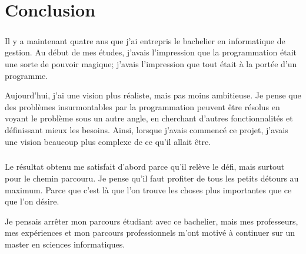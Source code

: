 \chapter{Conclusion}
\label{ch:conclusion}

\paragraph{}
Il y a maintenant quatre ans que j'ai entrepris le bachelier en informatique de gestion.
Au début de mes études, j'avais l'impression que la programmation était une sorte de pouvoir magique; j'avais l'impression que tout était à la portée d'un programme.

Aujourd'hui, j'ai une vision plus réaliste, mais pas moins ambitieuse.
Je pense que des problèmes insurmontables par la programmation peuvent être résolus en voyant le problème sous un autre angle, en cherchant d'autres fonctionnalités et définissant mieux les besoins.
Ainsi, lorsque j'avais commencé ce projet, j'avais une vision beaucoup plus complexe de ce qu'il allait être.

\paragraph{}
Le résultat obtenu me satisfait d'abord parce qu'il relève le défi, mais surtout pour le chemin parcouru.
Je pense qu'il faut profiter de tous les petits détours au maximum.
Parce que c'est là que l'on trouve les choses plus importantes que ce que l'on désire.

Je pensais arrêter mon parcours étudiant avec ce bachelier, mais mes professeurs, mes expériences et mon parcours professionnels m'ont motivé à continuer sur un master en sciences informatiques.

